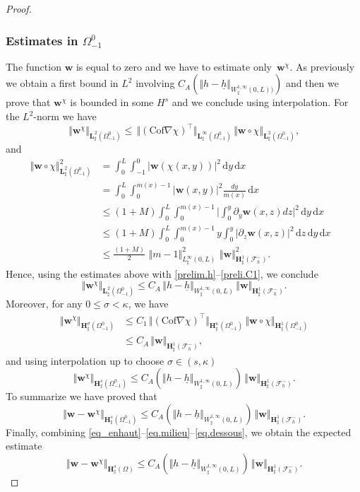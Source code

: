 \documentclass[10pt]{amsart}
\let\mathcal\mathscr
\theoremstyle{remark}
\theoremstyle{definition}
\newcommand{\norme}[1]{\,\Vert #1\Vert}
\newcommand{\vnorme}[1]{\Vert #1\Vert}
\newcommand{\bnorme}[1]{\,\bigl\Vert #1\bigr\Vert}
\newcommand{\dd}{\,\mathrm{d}}
\newcommand{\wg}{\boldsymbol{w}}
\newcommand{\BS}[1]{\boldsymbol{#1}}
\let\CM\Omega
\newcommand{\hb}{{\underline{h}}}
\newcommand{\Cof}{\mathrm{Cof}}
\begin{document}
\begin{proof}
\subsubsection*{Estimates in $\Omega_{-1}^{0}$} The function $\wg$ is equal to zero and we have to estimate only~$\wg^\chi$. As previously we obtain a first bound in $L^{2}$ involving $C_A(\vnorme{h-\hb}_{W^{1,\infty}_{\sharp}(0,L))})$ and then we prove that $\wg^\chi$ is bounded in some $H^{s}$ and we conclude using interpolation. For the $L^{2}$-norm we have
\[
\norme{\wg^\chi}_{\BS{L}^{2}_{\sharp}(\Omega_{-1}^{0})}\leq \norme{(\Cof\nabla\chi)^{\top}}_{\BS{L}^{\infty}_{\sharp}(\Omega_{-1}^{0})}\norme{\wg\circ\chi}_{\BS{L}^{2}_{\sharp}(\Omega_{-1}^{0})},
\]
and
\[
\begin{aligned}
\norme{\wg\circ\chi}^2_{\BS{L}^{2}_{\sharp}(\Omega_{-1}^{0})}&=\int_{0}^{L}\int_{-1}^{0}\vert \wg(\chi(x,y))\vert^{2}\dd y\dd x&{}\\
&=\int_{0}^{L}\int_{0}^{m(x)-1}\vert \wg(x,y)\vert^{2}\frac{dy}{m(x)}\dd x\\
&\leq (1+M)\int_{0}^{L}\int_{0}^{m(x)-1}\biggl\vert\int_{0}^{y}\partial_y\wg(x,z)dz\biggr\vert^{2}\dd y\dd x\\
&\leq (1+M)\int_{0}^{L}\int_{0}^{m(x)-1}y\int_{0}^{y}\vert\partial_z\wg(x,z)\vert^{2}\dd z\dd y\dd x\\
&\leq \frac{(1+M)}{2}\,\norme{m-1}_{L^{\infty}_{\sharp}(0,L)}^{2}\,\norme{\wg}_{\BS{H}^{1}_{\sharp}(\mathcal{F}^{-}_{h})}^{2}.
\end{aligned}
\]
Hence, using the estimates above with \eqref{prelim.h}--\eqref{preli.C1}, we conclude
\[\norme{\wg^\chi}_{\BS{L}^{2}_{\sharp}(\Omega_{-1}^{0})}\leq C_A\norme{h-\hb}_{W^{1,\infty}_{\sharp}(0,L)}\norme{\wg}_{\BS{H}^{1}_{\sharp}(\mathcal{F}^{-}_{h})}.
\]
Moreover, for any $0\leq \sigma<\kappa$, we have
\[
\begin{aligned}
\norme{\wg^\chi}_{\BS{H}^{\sigma}_{\sharp}(\Omega_{-1}^{0})}&{}\leq C_{1}\bnorme{(\Cof\nabla\chi)^{\top}}_{\BS{H}^{\kappa}_{\sharp}(\Omega_{-1}^{0})}\norme{\wg\circ\chi}_{\BS{H}^{1}_{\sharp}(\Omega_{-1}^{0})}\\
&\leq C_A\norme{\wg}_{\BS{H}^{1}_{\sharp}(\mathcal{F}^{-}_{h})},
\end{aligned}
\]
and using interpolation up to choose $\sigma \in (s,\kappa)$
\[\norme{\wg^\chi}_{\BS{H}^{s}_{\sharp}(\Omega_{-1}^{0})}\leq C_A(\vnorme{h-\hb}_{W^{1,\infty}_{\sharp}(0,L)})\norme{\wg}_{\BS{H}^{1}_{\sharp}(\mathcal{F}^{-}_{h})}.\]
To summarize we have proved that
\begin{equation} \label{eq.dessous}
\norme{\wg-\wg^\chi}_{\BS{H}^{s}_{\sharp}(\Omega_{-1}^0)}\leq C_A(\vnorme{h-\hb}_{W^{1,\infty}_{\sharp}(0,L)})\norme{\wg}_{\BS{H}^{1}_{\sharp}(\mathcal{F}^{-}_{h})}.
\end{equation}
Finally, combining \eqref{eq_enhaut}--\eqref{eq.milieu}--\eqref{eq.dessous}, we obtain the expected estimate
\begin{equation} \label{eq.total}
\norme{\wg-\wg^\chi}_{\BS{H}^{s}_{\sharp}(\CM)}\leq C_A(\vnorme{h-\hb}_{W^{1,\infty}_{\sharp}(0,L)})\norme{\wg}_{\BS{H}^{1}_{\sharp}(\mathcal{F}^{-}_{h})}.
\end{equation}


\end{proof}
\end{document}
